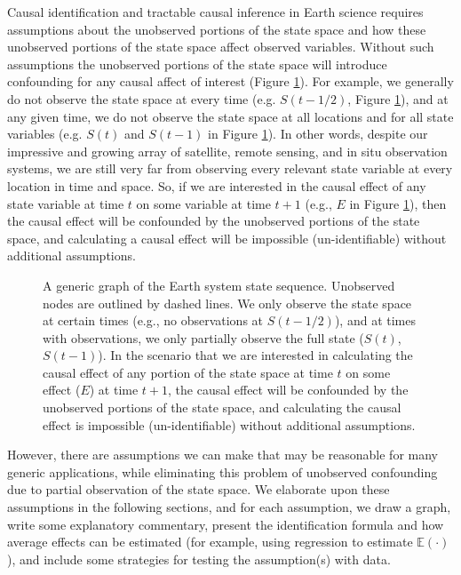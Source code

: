 \documentclass[12pt]{article}
\begin{document}
Causal identification and tractable causal inference in Earth science
requires assumptions about the unobserved portions of the state space
and how these unobserved portions of the state space affect observed
variables. Without such assumptions the unobserved portions of the state
space will introduce confounding for any causal affect of interest
(Figure \ref{fig:generic}). For example, we generally do not observe
the state space at every time (e.g. $S(t-1/2)$, Figure
\ref{fig:generic}), and at any given time, we do not observe the
state space at all locations and for all state variables (e.g. $S(t)$
and $S(t-1)$ in Figure \ref{fig:generic}). In other words, despite
our impressive and growing array of satellite, remote sensing, and in
situ observation systems, we are still very far from observing every
relevant state variable at every location in time and space.  So, if
we are interested in the causal effect of any state variable at time
$t$ on some variable at time $t+1$ (e.g., $E$ in Figure
\ref{fig:generic}), then the causal effect will be confounded by the
unobserved portions of the state space, and calculating a causal
effect will be impossible (un-identifiable) without additional
assumptions.

\begin{figure} 
  \caption{A generic graph of the Earth system state
    sequence. Unobserved nodes are outlined by dashed lines. We only
    observe the state space at certain times (e.g., no observations at
    $S(t-1/2)$), and at times with observations, we only partially
    observe the full state ($S(t)$, $S(t-1)$). In the scenario that we
    are interested in calculating the causal effect of any portion of
    the state space at time $t$ on some effect ($E$) at time $t+1$,
    the causal effect will be confounded by the unobserved portions of
    the state space, and calculating the causal effect is impossible
    (un-identifiable) without additional assumptions.}
  \label{fig:generic}
\end{figure}

However, there are assumptions we can make that may be reasonable for
many generic applications, while eliminating this
problem of unobserved confounding due to partial observation of the
state space. We elaborate upon these assumptions in the following
sections, and for each assumption, we draw a graph, write some
explanatory commentary, present the identification formula and how
average effects can be estimated (for example, using regression to
estimate $\mathbb{E}(\cdot )$), and include some strategies for
testing the assumption(s) with data.
\end{document}
